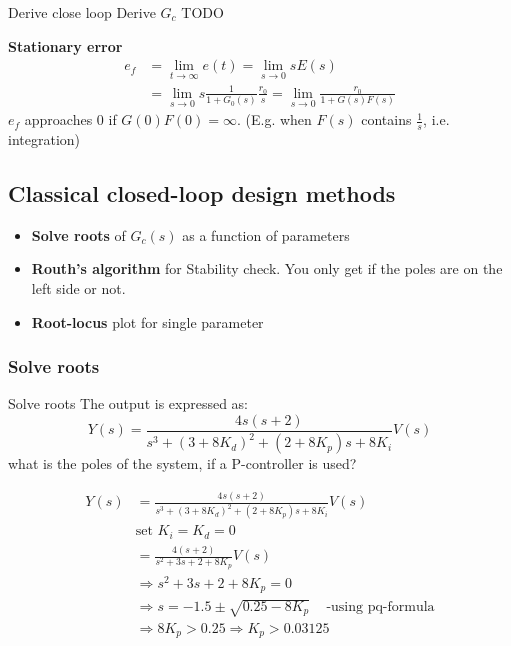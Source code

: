 \begin{exampleblock}{Derive close loop}
    Derive $G_c$ TODO
\end{exampleblock}

\textbf{Stationary error}
\begin{align*}
    e_f &= \lim_{t\to\infty}e(t) = \lim_{s\to0}sE(s) \\
    &= \lim_{s\to0}s\frac{1}{1+G_0(s)}\frac{r_0}{s} = \lim_{s\to0} \frac{r_0}{1+G(s)F(s)}
\end{align*}
$e_f$ approaches $0$ if $G(0)F(0)=\infty$. (E.g. when $F(s)$ contains $\frac{1}{s}$, i.e. integration)


\subsection{Classical closed-loop design methods}
\begin{itemize}
    \item \textbf{Solve roots} of $G_c(s)$ as a function of parameters
    \item \textbf{Routh's algorithm} for Stability check. You only get if the poles are on the left side or not.
    \item \textbf{Root-locus} plot for single parameter
\end{itemize}

\subsubsection{Solve roots}
\begin{exampleblock}{Solve roots}
    The output is expressed as:
    \begin{equation*}
        Y(s) = \frac{4s(s+2)}{s^3+(3+8K_d)^2+(2+8K_p)s+8K_i}V(s)
    \end{equation*}
    what is the poles of the system, if a P-controller is used?

    \begin{align*}
        Y(s) &= \frac{4s(s+2)}{s^3+(3+8K_d)^2+(2+8K_p)s+8K_i}V(s) \\
        &\text{set } K_i = K_d = 0 \\
        &= \frac{4(s+2)}{s^2+3s+2+8K_p}V(s) \\
        &\Rightarrow s^2+3s+2+8K_p = 0  \\ 
        &\Rightarrow s=-1.5 \pm \sqrt{0.25-8K_p} \;\;\; \text{ -using pq-formula}\\
        &\Rightarrow 8K_p > 0.25 \Rightarrow K_p > 0.03125
    \end{align*}
\end{exampleblock}


